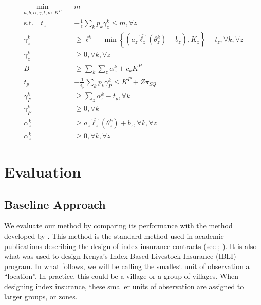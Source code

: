 \documentclass[11pt]{article}
\begin{document}
    \begin{align}
      \min_{a,b,\alpha,\gamma,t,m,K^P} \quad & m\\
      \text{s.t.} \quad t_z &+ \frac{1}{\epsilon} \sum_k p_k \gamma_z^k \leq m, \forall z\\
      \gamma_z^k &\geq \ell^k - \min\left\{(a_z\hat{\ell_z}(\theta_z^k) + b_z), K_z\right\} -t_z, \forall k, \forall z \\
      \gamma_z^k &\geq 0, \forall k, \forall z\\
      B &\geq \sum_k \sum_z \alpha^k_z + c_k K^P\\
      t_p &+ \frac{1}{\epsilon_p} \sum_k p_k \gamma_P^k \leq K^P+Z\pi_{SQ}\\
      \gamma_P^k &\geq \sum_z \alpha^k_z -t_p, \forall k \\
      \gamma_P^k &\geq 0, \forall k\\
      \alpha^k_z &\geq a_z \hat{\ell_z}(\theta^k_z) + b_z, \forall k, \forall z\\
      \alpha^k_z &\geq 0, \forall k, \forall z
    \end{align}

\section{Evaluation}
  \subsection{Baseline Approach}\label{baseline}
   We evaluate our method by comparing its performance with the method developed by \cite{chantarat2013designing}. This method is the standard method used in academic publications describing the design of index insurance contracts (see \cite{flatnes2018improving}; \cite{jensen2019does}). It is also what was used to design Kenya's Index Based Livestock Insurance (IBLI) program. In what follows, we will be calling the smallest unit of observation a ``location''. In practice, this could be a village or a group of villages. When designing index insurance, these smaller units of observation are assigned to larger groups, or zones. 
\end{document}
